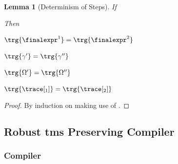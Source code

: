 \documentclass[a4paper,names,dvipsnames]{article}
\newtheorem{lemma}{Lemma}
\begin{document}
\begin{lemma}[Determinism of Steps]\label{lem:determ:steps}
  If
  Then
  \begin{goals}
  \item $\trg{\finalexpr^{1}}=\trg{\finalexpr^{2}}$
  \item $\trg{\gamma'}=\trg{\gamma''}$
  \item $\trg{\Omega'}=\trg{\Omega''}$
  \item $\trg{\trace[_{1}]}=\trg{\trace[_{2}]}$
  \end{goals}
\end{lemma}
\begin{proof}
  By induction on  making use of .
\end{proof}

\subsection{Robust \gls*{tms} Preserving Compiler}

\subsubsection{Compiler}
\end{document}
